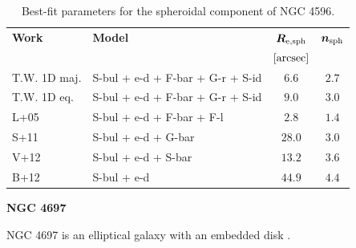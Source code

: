 \documentclass[preprint2]{emulateapj}
\begin{document}
  \begin{table}[h]
  \small
  \caption{Best-fit parameters for the spheroidal component of NGC 4596.}
  \begin{center}
  \begin{tabular}{llcc}
  \hline
  {\bf Work} & {\bf Model}   & $\bm R_{\rm e,sph}$    & $\bm n_{\rm sph}$ \\
    &  &  $[\rm arcsec]$ & \\
  \hline
  T.W. 1D maj. & S-bul + e-d + F-bar + G-r + S-id & $6.6$  &  $2.7$ \\
  T.W. 1D eq.  & S-bul + e-d + F-bar + G-r + S-id & $9.0$  &  $3.0$ \\
  \hline
  L+05      & S-bul + e-d + F-bar + F-l & $2.8$  &  $1.4$ \\
  S+11      & S-bul + e-d + G-bar & $28.0$  &  $3.0$ \\
  V+12      & S-bul + e-d + S-bar & $13.2$  &  $3.6$ \\
  B+12      & S-bul + e-d & $44.9$  &  $4.4$ \\
  \hline
  \end{tabular}
  \end{center}
  \label{tab:n4596}
  \end{table}



  \clearpage\newpage\noindent
  {\bf NGC 4697 \\}

  NGC 4697 is an elliptical galaxy with an embedded disk \cite{scorzabender1995}.

\end{document}
